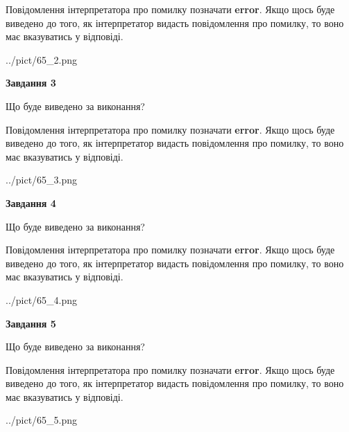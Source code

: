 \documentclass[12pt, ukrainian]{article}
\begin{document}
{\begin {large}
Повідомлення інтерпретатора про помилку позначати \textbf{error}.
Якщо щось буде виведено до того, як інтерпретатор видасть повідомлення про помилку, 
то воно має вказуватись у відповіді. \par


\begin{center}
	{../pict/65_2.png}
\end{center}
\newpage

{\begin {center}\textbf{Завдання 3}\end {center}}\par
Що буде виведено за виконання?

Повідомлення інтерпретатора про помилку позначати \textbf{error}.
Якщо щось буде виведено до того, як інтерпретатор видасть повідомлення про помилку, 
то воно має вказуватись у відповіді. \par


\begin{center}
	{../pict/65_3.png}
\end{center}
\newpage

{\begin {center}\textbf{Завдання 4}\end {center}}\par
Що буде виведено за виконання?

Повідомлення інтерпретатора про помилку позначати \textbf{error}.
Якщо щось буде виведено до того, як інтерпретатор видасть повідомлення про помилку, 
то воно має вказуватись у відповіді. \par


\begin{center}
	{../pict/65_4.png}
\end{center}
\newpage

{\begin {center}\textbf{Завдання 5}\end {center}}\par
Що буде виведено за виконання?

Повідомлення інтерпретатора про помилку позначати \textbf{error}.
Якщо щось буде виведено до того, як інтерпретатор видасть повідомлення про помилку, 
то воно має вказуватись у відповіді. \par


\begin{center}
	{../pict/65_5.png}
\end{center}
\newpage


\end{large}}
\end{document}
